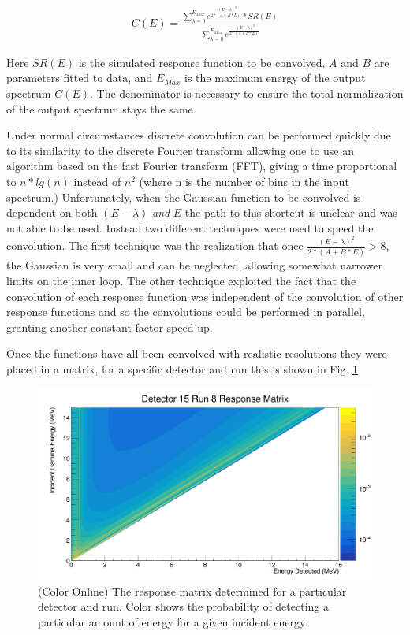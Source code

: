 \documentclass[5p]{elsarticle}
\begin{document}
\begin{align}
C(E) = \frac{\sum_{\lambda{}=0}^{E_{Max}}  e^{\frac{-(E-\lambda{})^2}{2*(A + B*E)}} * SR(E)}{\sum_{\lambda{}=0}^{E_{Max}}  e^{\frac{-(E-\lambda{})^2}{2*(A + B*E)}}}
\label{eqn-convolution}
\end{align}

Here $SR(E)$ is the simulated response function to be convolved, $A$ and $B$ are parameters fitted to data, and $E_{Max}$ is the maximum energy of the output spectrum $C(E)$. The denominator is necessary to ensure the total normalization of the output spectrum stays the same.

Under normal circumstances discrete convolution can be performed quickly due to its similarity to the discrete Fourier transform allowing one to use an algorithm based on the fast Fourier transform (FFT), giving a time proportional to $n*lg(n)$ instead of $n^2$ (where n is the number of bins in the input spectrum.) Unfortunately, when the Gaussian function to be convolved is dependent on both $(E-\lambda{})$ \emph{and} $E$ the path to this shortcut is unclear and was not able to be used. Instead two different techniques were used to speed the convolution. The first technique was the realization that once $\frac{(E-\lambda{})^2}{2*(A + B*E)} > 8$, the Gaussian is very small and can be neglected, allowing somewhat narrower limits on the inner loop. The other technique exploited the fact that the convolution of each response function was independent of the convolution of other response functions and so the convolutions could be performed in parallel, granting another constant factor speed up.

Once the functions have all been convolved with realistic resolutions they were placed in a matrix, for a specific detector and run this is shown in Fig. \ref{fig-resp-mat}

\begin{figure}[t]
\begin{center}
\includegraphics[width=\linewidth]{resp_mat_png}
\caption{(Color Online) The response matrix determined for a particular detector and run. Color shows the probability of detecting a particular amount of energy for a given incident energy.}
\label{fig-resp-mat}
\end{center}
\end{figure}
\end{document}
